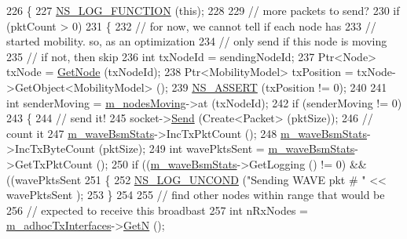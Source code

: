 \begin{DoxyCode}
226 \{
227   \hyperlink{log-macros-disabled_8h_a90b90d5bad1f39cb1b64923ea94c0761}{NS\_LOG\_FUNCTION} (\textcolor{keyword}{this});
228 
229   \textcolor{comment}{// more packets to send?}
230   \textcolor{keywordflow}{if} (pktCount > 0)
231     \{
232       \textcolor{comment}{// for now, we cannot tell if each node has}
233       \textcolor{comment}{// started mobility.  so, as an optimization}
234       \textcolor{comment}{// only send if  this node is moving}
235       \textcolor{comment}{// if not, then skip}
236       \textcolor{keywordtype}{int} txNodeId = sendingNodeId;
237       Ptr<Node> txNode = \hyperlink{classns3_1_1Application_a664b15088389bec8e35b35742138f097}{GetNode} (txNodeId);
238       Ptr<MobilityModel> txPosition = txNode->GetObject<MobilityModel> ();
239       \hyperlink{assert_8h_a6dccdb0de9b252f60088ce281c49d052}{NS\_ASSERT} (txPosition != 0);
240 
241       \textcolor{keywordtype}{int} senderMoving = \hyperlink{classns3_1_1BsmApplication_a573c92bdce7e395c9509e3b856d8fa6c}{m\_nodesMoving}->at (txNodeId);
242       \textcolor{keywordflow}{if} (senderMoving != 0)
243         \{
244           \textcolor{comment}{// send it!}
245           socket->\hyperlink{classns3_1_1Socket_a036901c8f485fe5b6eab93b7f2ec289d}{Send} (Create<Packet> (pktSize));
246           \textcolor{comment}{// count it}
247           \hyperlink{classns3_1_1BsmApplication_afc424d5340ea34ee3099625627b8c036}{m\_waveBsmStats}->IncTxPktCount ();
248           \hyperlink{classns3_1_1BsmApplication_afc424d5340ea34ee3099625627b8c036}{m\_waveBsmStats}->IncTxByteCount (pktSize);
249           \textcolor{keywordtype}{int} wavePktsSent = \hyperlink{classns3_1_1BsmApplication_afc424d5340ea34ee3099625627b8c036}{m\_waveBsmStats}->GetTxPktCount ();
250           \textcolor{keywordflow}{if} ((\hyperlink{classns3_1_1BsmApplication_afc424d5340ea34ee3099625627b8c036}{m\_waveBsmStats}->GetLogging () != 0) && ((wavePktsSent %
251             \{
252               \hyperlink{log-macros-disabled_8h_a0b36e5e182b37194f85ef1c5e979fb2e}{NS\_LOG\_UNCOND} (\textcolor{stringliteral}{"Sending WAVE pkt # "} << wavePktsSent );
253             \}
254 
255           \textcolor{comment}{// find other nodes within range that would be}
256           \textcolor{comment}{// expected to receive this broadbast}
257           \textcolor{keywordtype}{int} nRxNodes = \hyperlink{classns3_1_1BsmApplication_a0eecb4df76f2dd46564c5f0b14260e3b}{m\_adhocTxInterfaces}->\hyperlink{classns3_1_1Ipv4InterfaceContainer_a8d565289d84cd90ef806d0f86e6235f9}{GetN} ();

\end{DoxyCode}
